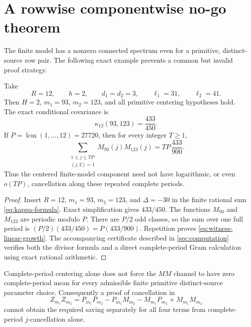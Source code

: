 \section{A rowwise componentwise no-go theorem}
\label{sec:nogo}

The finite model has a nonzero connected spectrum even for a primitive,
distinct-source row pair.  The following exact example prevents a
common but invalid proof strategy.

\begin{theorem}
\label{thm:model-witness}
Take
\begin{equation}
 R=12,\qquad h=2,\qquad d_1=d_2=3,
 \qquad \ell_1=31,\qquad \ell_2=41.
 \label{eq:witness-data}
\end{equation}
Then \(H=2\), \(m_1=93\), \(m_2=123\), and all primitive centering
hypotheses hold.  The exact conditional covariance is
\begin{equation}
 \boxed{\qquad \kappa_{12}(93,123)=\frac{433}{450}.\qquad}
 \label{eq:witness-covariance}
\end{equation}
If \(P=\operatorname{lcm}(1,\ldots,12)=27720\), then for every
integer \(T\ge1\),
\begin{equation}
 \sum_{\substack{1\le j\le TP\\(j,2)=1}}
 M_{93}(j)M_{123}(j)
 =TP\,\frac{433}{900}.
 \label{eq:witness-linear-growth}
\end{equation}
Thus the centered finite-model component need not have logarithmic, or
even \(o(TP)\), cancellation along these repeated complete periods.
\end{theorem}

\begin{proof}
Insert \(R=12\), \(m_1=93\), \(m_2=123\), and
\(\Delta=-30\) in the finite rational sum
\eqref{eq:kappa-formula}.  Exact simplification gives \(433/450\).
The functions \(M_{93}\) and \(M_{123}\) are periodic modulo \(P\).
There are \(P/2\) odd classes, so the sum over one full period is
\((P/2)(433/450)=P(433/900)\).  Repetition proves
\eqref{eq:witness-linear-growth}.  The accompanying certificate
described in \cref{sec:computation} verifies both the divisor formula
and a direct complete-period Gram calculation using exact rational
arithmetic.
\end{proof}

\begin{corollary}
\label{cor:componentwise-nogo}
Complete-period centering alone does not force the \(MM\) channel to
have zero complete-period mean for every admissible finite primitive
distinct-source parameter choice.  Consequently a proof of
cancellation in
\begin{equation}
 Z_{m_1}Z_{m_2}
 =P_{m_1}P_{m_2}-P_{m_1}M_{m_2}
 -M_{m_1}P_{m_2}+M_{m_1}M_{m_2}
 \label{eq:centered-four-channel}
\end{equation}
cannot obtain the required saving separately for all four terms from
complete-period \(j\)-cancellation alone.
\end{corollary}

